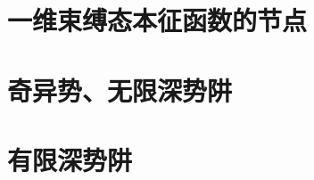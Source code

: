 \section{一维束缚态本征函数的节点}







\section{奇异势、无限深势阱}










\section{有限深势阱}
























